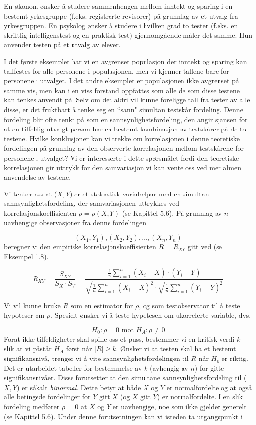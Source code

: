 En økonom ønsker å studere sammenhengen mellom
inntekt og sparing i en bestemt yrkesgruppe (f.eks. registrerte revisorer)
på grunnlag av et utvalg fra yrkesgruppen.  En psykolog ønsker 
å studere i hvilken grad to tester (f.eks. en skriftlig 
intelligenstest og en praktisk test) gjennomgående måler det
samme.  Hun anvender testen på et utvalg av elever.

I det første eksemplet har vi en avgrenset populasjon der inntekt og
sparing kan tallfestes for alle personene i populasjonen, men vi kjenner
tallene bare for personene i utvalget.  I det andre eksemplet er populasjonen 
ikke avgrenset på samme vis, men kan i en viss forstand oppfattes som 
alle de som disse testene kan tenkes anvendt på.  Selv om det aldri
vil kunne foreligge tall fra tester av alle disse, er det fruktbart å
tenke seg en ``sann" simultan testskår fordeling.  Denne fordeling blir
ofte tenkt på som en sannsynlighetsfordeling, den angir sjansen for
at en tilfeldig utvalgt person har en bestemt kombinasjon av testskårer
på de to testene.  Hvilke konklusjoner kan vi trekke om korrelasjonen
i denne teoretiske fordelingen på grunnlag av den observerte 
korrelasjonen mellom testskårene for personene i utvalget?  Vi er
inte\-res\-serte i dette spørsmålet fordi den teoretiske korrelasjonen
gir uttrykk for den samvariasjon vi kan vente oss ved mer almen anvendelse
av testene.

Vi tenker oss at ($X, Y$) er et stokastisk variabelpar med en 
simultan sannsynlighetsfordeling, der samvariasjonen uttrykkes ved
korrelasjons\-koeffisienten $\rho = \rho(X, Y)$ (se Kapittel 5.6).  På
grunnlag av $n$ uavhengige observasjoner fra denne fordelingen

\[  (X_1, Y_1),  (X_2, Y_2), \ldots, (X_n, Y_n)    \]
beregner vi den empiriske korrelasjonskoeffisienten $R = R_{XY}$ gitt
ved (se Eksempel 1.8).

\[ R_{XY}=\frac{S_{XY}}{S_X\cdot S_Y}=
             \frac{\frac{1}{n}\sum_{i=1}^n (X_i-\bar{X})\cdot (Y_i-\bar{Y})}
    {\sqrt{\frac{1}{n}\sum_{i=1}^n {(X_i-\bar{X})}^2}\cdot
     \sqrt{\frac{1}{n}\sum_{i=1}^n {(Y_i-\bar{Y})}^2}} \]

Vi vil kunne bruke $R$ som en estimator for $\rho$, og som testobservator
til å teste hypoteser om $\rho$.  Spesielt ønsker vi å teste
hypotesen om ukorrelerte variable, dvs.

\[ H_0 : \rho=0 \mbox{\ \ mot \ \ } H_A : \rho \neq 0   \]
Forat ikke tilfeldigheter skal spille oss et puss, bestemmer vi en 
kritisk verdi $k$ slik at vi påstår $H_A$ først når
$\mid R \mid \geq k$.  Ønsker vi at testen skal ha et bestemt
signifikansnivå, trenger vi å vite sannsynlighetsfordelingen til
$R$ når $H_0$ er riktig.  Det er utarbeidet tabeller for
bestemmelse av $k$ (avhengig av $n$) for gitte signifikansnivåer.
Disse forutsetter at den simultane sannsynlighetsfordeling til ($X, Y$)
er såkalt {\em binormal}. Dette betyr at både $X$ og $Y$ er normalfordelte
og at også alle betingede fordelinger for $Y$ gitt $X$ (og $X$ gitt $Y$)
er normalfordelte. I en slik fordeling medfører $\rho$ = 0 at
$X$ og $Y$ er uavhengige, noe som ikke gjelder generelt (se Kapittel 5.6).
Under denne forutsetningen kan vi isteden ta utgangspunkt i 

